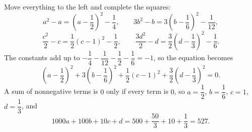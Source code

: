 Move everything to the left and complete the squares:
\[
a^2-a=\left(a-\dfrac{1}{2}\right)^2-\dfrac{1}{4},\qquad 3b^2-b=3\left(b-\dfrac{1}{6}\right)^2-\dfrac{1}{12},
\]
\[
\dfrac{c^2}{2}-c=\dfrac{1}{2}(c-1)^2-\dfrac{1}{2},\qquad \dfrac{3d^2}{2}-d=\dfrac{3}{2}\left(d-\dfrac{1}{3}\right)^2-\dfrac{1}{6} .
\]
The constants add up to $-\dfrac{1}{4}-\dfrac{1}{12}-\dfrac{1}{2}-\dfrac{1}{6}=-1$, so the equation becomes
\[
\left(a-\dfrac{1}{2}\right)^2+3\left(b-\dfrac{1}{6}\right)^2+\dfrac{1}{2}(c-1)^2+\dfrac{3}{2}\left(d-\dfrac{1}{3}\right)^2=0 .
\]
A sum of nonnegative terms is $0$ only if every term is $0$, so $a=\dfrac{1}{2}$, $b=\dfrac{1}{6}$, $c=1$, $d=\dfrac{1}{3}$, and
\[
1000a+100b+10c+d=500+\dfrac{50}{3}+10+\dfrac{1}{3}=\boxed{527}.
\]
